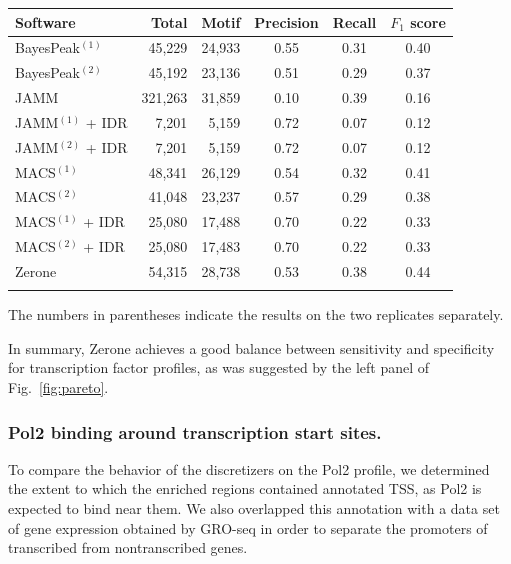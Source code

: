 \documentclass{bioinfo}
\begin{document}
\begin{table}[!b]
{\begin{tabular}{lrrccc}
        \toprule
        \textbf{Software}  & \textbf{Total}  & \textbf{Motif} &
        \textbf{Precision} & \textbf{Recall} & \textbf{$F_{1}$ score} \\
        \midrule
        BayesPeak$^{(1)}$  &  45,229 & 24,933 & 0.55 & 0.31 & 0.40 \\
        BayesPeak$^{(2)}$  &  45,192 & 23,136 & 0.51 & 0.29 & 0.37 \\
        JAMM               & 321,263 & 31,859 & 0.10 & 0.39 & 0.16 \\
        JAMM$^{(1)}$ + IDR &   7,201 &  5,159 & 0.72 & 0.07 & 0.12 \\
        JAMM$^{(2)}$ + IDR &   7,201 &  5,159 & 0.72 & 0.07 & 0.12 \\
        MACS$^{(1)}$       &  48,341 & 26,129 & 0.54 & 0.32 & 0.41 \\
        MACS$^{(2)}$       &  41,048 & 23,237 & 0.57 & 0.29 & 0.38 \\
        MACS$^{(1)}$ + IDR &  25,080 & 17,488 & 0.70 & 0.22 & 0.33 \\
        MACS$^{(2)}$ + IDR &  25,080 & 17,483 & 0.70 & 0.22 & 0.33 \\
        Zerone             &  54,315 & 28,738 & 0.53 & 0.38 & 0.44 \\
        \botrule
\end{tabular}}{The numbers in parentheses indicate the results on the two
replicates separately.}
\end{table}

In summary, Zerone achieves a good balance between sensitivity and
specificity for transcription factor profiles, as was suggested by
the left panel of Fig.~\ref{fig:pareto}.

\subsubsection{Pol2 binding around transcription start sites.}
\label{subsub:pol2}
To compare the behavior of the discretizers on the Pol2 profile,
we determined the extent to which the enriched regions contained
annotated TSS, as Pol2 is expected to bind near them.
We also overlapped this annotation with a data set of
gene expression obtained by GRO-seq in order to separate the
promoters of transcribed from nontranscribed genes.
\end{document}
